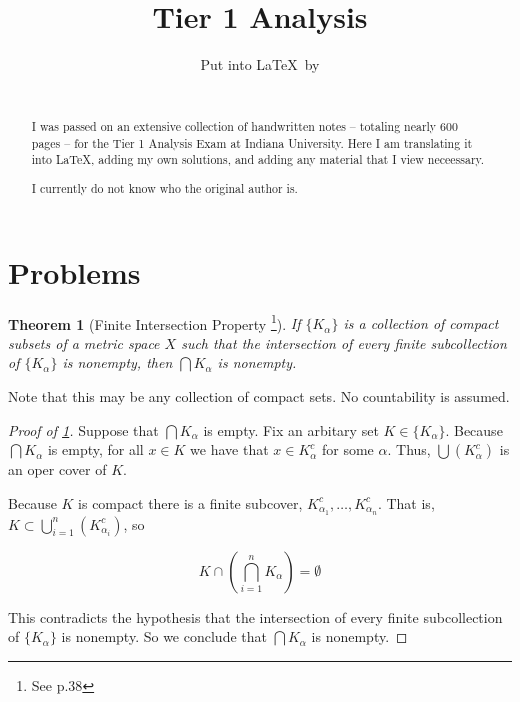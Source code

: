 \documentclass[english]{article}
\date{}
\title{Tier 1 Analysis}
\author{Put into \LaTeX\ by \\ \fullname \\ \textit{\email}}
\newtheorem{theorem}{Theorem} %
\theoremstyle{definition}
\begin{document}
\begin{minipage}{\textwidth}
    \maketitle
    \begin{abstract}
        I was passed on an extensive collection of handwritten notes -- totaling nearly 600 pages -- for the Tier 1 Analysis Exam at Indiana University. Here I am translating it into \LaTeX, adding my own solutions, and adding any material that I view neceessary. 
        
        I currently do not know who the original author is.
    \end{abstract}
\end{minipage}

\pagebreak

\tableofcontents

\pagebreak

\section{Problems}

\begin{theorem}[Finite Intersection Property \footnote{See \cite{rudin} p.38}]
    \label{thm:finite_intersection}
    If $\{K_{\alpha}\}$ is a collection of compact subsets of a metric space $X$ such that the intersection of every finite subcollection of $\{K_{\alpha}\}$ is nonempty, then $\bigcap K_{\alpha}$ is nonempty. 
\end{theorem}

Note that this may be any collection of compact sets. No countability is assumed.

\begin{proof}[Proof of \cref{thm:finite_intersection}]
    Suppose that $\bigcap K_{\alpha}$ is empty. Fix an arbitary set $K \in \{K_{\alpha}\}$. Because $\bigcap K_{\alpha}$ is empty, for all $x \in K$ we have that $x \in K_{\alpha}^c$ for some $\alpha$. Thus, $\bigcup \left( K_{\alpha}^c \right)$ is an oper cover of $K$. 

    Because $K$ is compact there is a finite subcover, $K_{\alpha_1}^c, \dots, K_{\alpha_n}^c$. That is, $K \subset \bigcup_{i = 1}^n \left( K_{\alpha_i}^c \right)$, so 
    
    \[
        K \cap \left( \bigcap_{i = 1}^n K_{\alpha} \right) = \emptyset
    \]

    This contradicts the hypothesis that the intersection of every finite subcollection of $\{K_{\alpha}\}$ is nonempty. So we conclude that $\bigcap K_{\alpha}$ is nonempty.
\end{proof}
\end{document}
